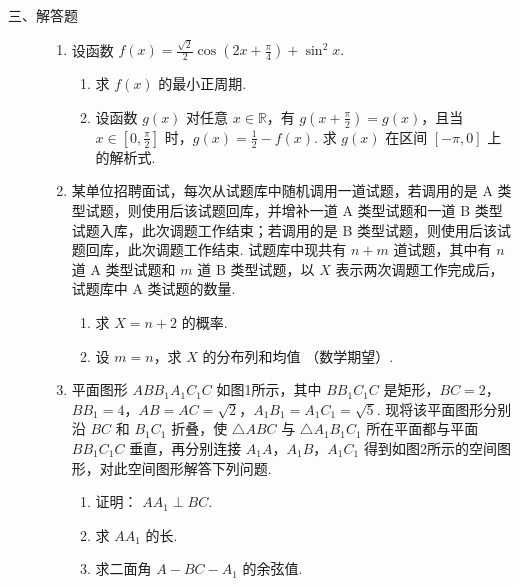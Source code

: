 \begin{description}

    \item[三、解答题]

    \begin{enumerate}[leftmargin=5pt]

      \addtocounter{enumi}{+15}

        \item 设函数 \( f(x) = \frac{\sqrt{2}}{2}\cos \left(2x + \frac{\pi}{4}\right) + \sin^2 x. \)

\begin{enumerate}
\item 求 \( f(x) \) 的最小正周期.
\item 设函数 \( g(x) \) 对任意 \( x \in \mathbb{R} \)，有 \( g\left(x + \frac{\pi}{2}\right) = g(x) \)，且当 \( x \in \left[0, \frac{\pi}{2}\right] \) 时，\( g(x) = \frac{1}{2} - f(x) \). 求 \( g(x) \) 在区间 \([- \pi, 0]\) 上的解析式.
\end{enumerate}

        \item 某单位招聘面试，每次从试题库中随机调用一道试题，若调用的是 A 类型试题，则使用后该试题回库，并增补一道 A 类型试题和一道 B 类型试题入库，此次调题工作结束；若调用的是 B 类型试题，则使用后该试题回库，此次调题工作结束. 试题库中现共有 \( n + m \) 道试题，其中有 \(n\) 道 A 类型试题和 \(m\) 道 B 类型试题，以 \(X\) 表示两次调题工作完成后，试题库中 A 类试题的数量.

\begin{enumerate}
\item 求 \(X = n + 2\) 的概率.
\item 设 \(m = n\)，求 \(X\) 的分布列和均值 （数学期望）.
\end{enumerate}

        \item 平面图形 \(ABB_{1}A_{1}C_{1}C\) 如图1所示，其中 \(BB_{1}C_{1}C\) 是矩形，\(BC = 2\)，\(BB_{1} = 4\)，\(AB = AC = \sqrt{2}\)，\(A_{1}B_{1} = A_{1}C_{1} = \sqrt{5}\). 现将该平面图形分别沿 \(BC\) 和 \(B_{1}C_{1}\) 折叠，使 \(\triangle ABC\) 与 \(\triangle A_{1}B_{1}C_{1}\) 所在平面都与平面 \(BB_{1}C_{1}C\) 垂直，再分别连接 \(A_{1}A\)，\(A_{1}B\)，\(A_{1}C_{1}\) 得到如图2所示的空间图形，对此空间图形解答下列问题.

\begin{enumerate}
\item 证明： \( AA_{1} \perp BC\).
\item 求 \(AA_{1}\) 的长.
\item 求二面角 \( A - BC - A_{1} \) 的余弦值.
\end{enumerate}


\end{enumerate}
\end{description}
